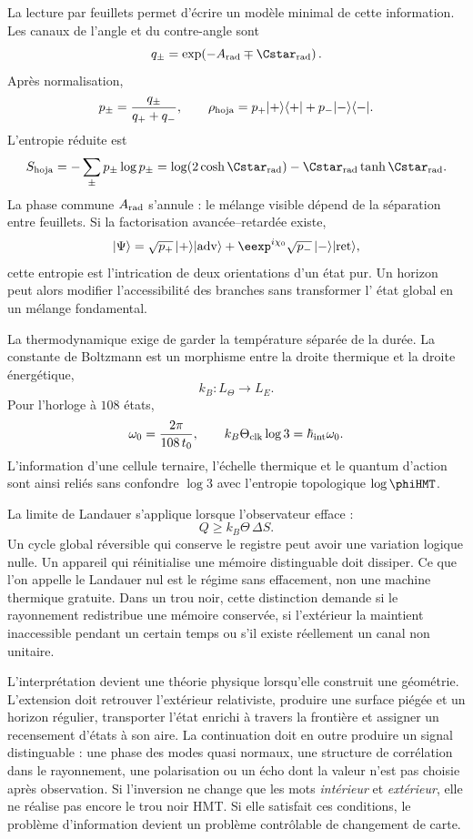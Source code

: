 La lecture par feuillets permet d'écrire un modèle minimal de cette information. Les
canaux de l'angle et du contre-angle sont
\[
 q_\pm
 =
 \exp\!\left(-A_{\rm rad}\mp \Cstar_{\rm rad}\right).
\]
Après normalisation,
\[
 p_\pm=\frac{q_\pm}{q_++q_-},
\qquad
 \rho_{\rm hoja}
 =
 p_+|+\rangle\langle+|
 +
 p_-|-\rangle\langle-|.
\]
L'entropie réduite est
\[
 S_{\rm hoja}
 =
 -\sum_{\pm}p_\pm\log p_\pm
 =
 \log\!\left(2\cosh\Cstar_{\rm rad}\right)
 -
 \Cstar_{\rm rad}\tanh\Cstar_{\rm rad}.
\]
La phase commune \(A_{\rm rad}\) s'annule : le mélange visible dépend de la séparation
entre feuillets. Si la factorisation avancée--retardée existe,
\[
 |\Psi\rangle
 =
 \sqrt{p_+}\,|+\rangle|\mathrm{adv}\rangle
 +
 \eexp^{i\chi_0}
 \sqrt{p_-}\,|-\rangle|\mathrm{ret}\rangle,
\]
cette entropie est l'intrication de deux orientations d'un état pur. Un
horizon peut alors modifier l'accessibilité des branches sans transformer l'
état global en un mélange fondamental.

La thermodynamique exige de garder la température séparée de la durée. La
constante de Boltzmann est un morphisme entre la droite thermique et la droite énergétique,
\[
 k_B:L_\Theta\longrightarrow L_E.
\]
Pour l'horloge à \(108\) états,
\[
 \omega_0=\frac{2\pi}{108\,t_0},
\qquad
 k_B\Theta_{\rm clk}\log3
 =
 \hbar_{\rm int}\omega_0.
\]
L'information d'une cellule ternaire, l'échelle thermique et le quantum d'action sont
ainsi reliés sans confondre \(\log3\) avec l'entropie topologique
\(\log\phiHMT\).

La limite de Landauer s'applique lorsque l'observateur efface :
\[
 Q\geq k_B\Theta\,\Delta S.
\]
Un cycle global réversible qui conserve le registre peut avoir une variation logique
nulle. Un appareil qui réinitialise une mémoire distinguable doit dissiper. Ce que l'on
appelle le Landauer nul est le régime sans effacement, non une machine thermique gratuite.
Dans un trou noir, cette distinction demande si le rayonnement redistribue une
mémoire conservée, si l'extérieur la maintient inaccessible pendant un certain temps ou s'il
existe réellement un canal non unitaire.

L'interprétation devient une théorie physique lorsqu'elle construit une géométrie.
L'extension doit retrouver l'extérieur relativiste, produire une surface
piégée et un horizon régulier, transporter l'état enrichi à travers la
frontière et assigner un recensement d'états à son aire. La continuation doit en outre
produire un signal distinguable : une phase des modes quasi normaux, une structure
de corrélation dans le rayonnement, une polarisation ou un écho dont la valeur n'est pas choisie
après observation. Si l'inversion ne change que les mots \emph{intérieur} et
\emph{extérieur}, elle ne réalise pas encore le trou noir HMT. Si elle satisfait ces
conditions, le problème d'information devient un problème contrôlable de
changement de carte.


